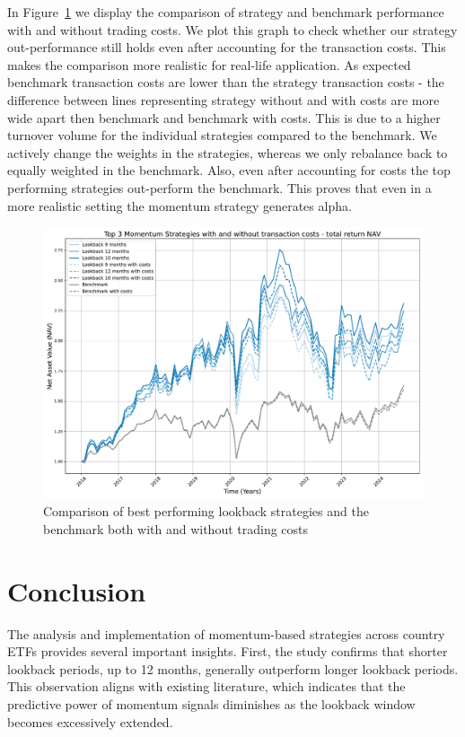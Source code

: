 \documentclass[a4paper,12pt,twoside]{article}
\begin{document}
In Figure~\ref{fig:costs} we display the comparison of strategy and benchmark performance with and without trading costs. We plot this graph to check whether our strategy out-performance still holds even after accounting for the transaction costs. This makes the comparison more realistic for real-life application. As expected benchmark transaction costs are lower than the strategy transaction costs - the difference between lines representing strategy without and with costs are more wide apart then benchmark and benchmark with costs. This is due to a higher turnover volume for the individual strategies compared to the benchmark. We actively change the weights in the strategies, whereas we only rebalance back to equally weighted in the benchmark. Also, even after accounting for costs the top performing strategies out-perform the benchmark. This proves that even in a more realistic setting the momentum strategy generates alpha.

\begin{figure}[h]
    \centering
    \includegraphics[width=15cm]{figures/fig_costs.pdf}
    \caption{Comparison of best performing lookback strategies and the benchmark both with and without trading costs}
    \label{fig:costs}
\end{figure}



\clearpage
\newpage
\section{Conclusion}

The analysis and implementation of momentum-based strategies across country ETFs provides several important insights. First, the study confirms that shorter lookback periods, up to 12 months, generally outperform longer lookback periods. This observation aligns with existing literature, which indicates that the predictive power of momentum signals diminishes as the lookback window becomes excessively extended.
\end{document}
